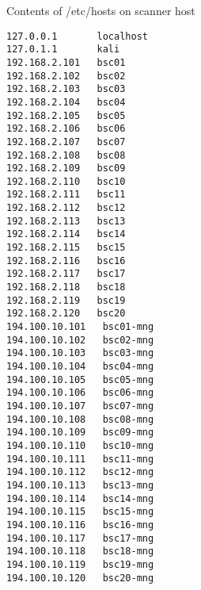 \begin{listing}[!ht]
\caption{Contents of /etc/hosts on scanner host}
\label{lst:EtcHostsScannerHost}
\begin{verbatim}
127.0.0.1       localhost
127.0.1.1       kali
192.168.2.101   bsc01
192.168.2.102   bsc02
192.168.2.103   bsc03
192.168.2.104   bsc04
192.168.2.105   bsc05
192.168.2.106   bsc06
192.168.2.107   bsc07
192.168.2.108   bsc08
192.168.2.109   bsc09
192.168.2.110   bsc10
192.168.2.111   bsc11
192.168.2.112   bsc12
192.168.2.113   bsc13
192.168.2.114   bsc14
192.168.2.115   bsc15
192.168.2.116   bsc16
192.168.2.117   bsc17
192.168.2.118   bsc18
192.168.2.119   bsc19
192.168.2.120   bsc20
194.100.10.101   bsc01-mng
194.100.10.102   bsc02-mng
194.100.10.103   bsc03-mng
194.100.10.104   bsc04-mng
194.100.10.105   bsc05-mng
194.100.10.106   bsc06-mng
194.100.10.107   bsc07-mng
194.100.10.108   bsc08-mng
194.100.10.109   bsc09-mng
194.100.10.110   bsc10-mng
194.100.10.111   bsc11-mng
194.100.10.112   bsc12-mng
194.100.10.113   bsc13-mng
194.100.10.114   bsc14-mng
194.100.10.115   bsc15-mng
194.100.10.116   bsc16-mng
194.100.10.117   bsc17-mng
194.100.10.118   bsc18-mng
194.100.10.119   bsc19-mng
194.100.10.120   bsc20-mng
\end{verbatim}
\end{listing}



